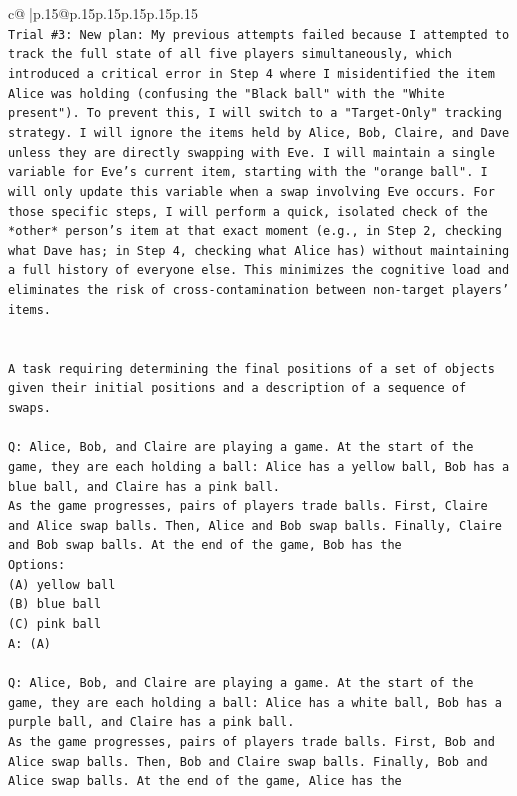 \documentclass{article}
\begin{document}
{\begin{supertabular}{c@{$\;$}|p{.15\linewidth}@{}p{.15\linewidth}p{.15\linewidth}p{.15\linewidth}p{.15\linewidth}p{.15\linewidth}}
{{{\\ 
\texttt{Trial \#3: New plan: My previous attempts failed because I attempted to track the full state of all five players simultaneously, which introduced a critical error in Step 4 where I misidentified the item Alice was holding (confusing the "Black ball" with the "White present"). To prevent this, I will switch to a "Target{-}Only" tracking strategy. I will ignore the items held by Alice, Bob, Claire, and Dave unless they are directly swapping with Eve. I will maintain a single variable for Eve's current item, starting with the "orange ball". I will only update this variable when a swap involving Eve occurs. For those specific steps, I will perform a quick, isolated check of the *other* person's item at that exact moment (e.g., in Step 2, checking what Dave has; in Step 4, checking what Alice has) without maintaining a full history of everyone else. This minimizes the cognitive load and eliminates the risk of cross{-}contamination between non{-}target players' items.} \\
\\ 
\\ 
\texttt{A task requiring determining the final positions of a set of objects given their initial positions and a description of a sequence of swaps.} \\
\\ 
\texttt{Q: Alice, Bob, and Claire are playing a game. At the start of the game, they are each holding a ball: Alice has a yellow ball, Bob has a blue ball, and Claire has a pink ball.} \\
\texttt{As the game progresses, pairs of players trade balls. First, Claire and Alice swap balls. Then, Alice and Bob swap balls. Finally, Claire and Bob swap balls. At the end of the game, Bob has the} \\
\texttt{Options:} \\
\texttt{(A) yellow ball} \\
\texttt{(B) blue ball} \\
\texttt{(C) pink ball} \\
\texttt{A: (A)} \\
\\ 
\texttt{Q: Alice, Bob, and Claire are playing a game. At the start of the game, they are each holding a ball: Alice has a white ball, Bob has a purple ball, and Claire has a pink ball.} \\
\texttt{As the game progresses, pairs of players trade balls. First, Bob and Alice swap balls. Then, Bob and Claire swap balls. Finally, Bob and Alice swap balls. At the end of the game, Alice has the} \\
}}}
\end{supertabular}}
\end{document}
